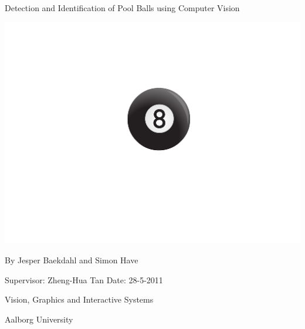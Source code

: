 \begin{titlingpage}
  \thispagestyle{empty}
  \centering
  { \setlength{\baselineskip}{24pt}
    {\Huge Detection and Identification of Pool Balls using Computer Vision
    }\par
    \par\vspace*{4\onelineskip}
    \par


	\includegraphics[width=.5\textwidth]{images/8ball}

    \par\vspace*{2\onelineskip}
	\par\par
    \par
    
    \large By Jesper Baekdahl and Simon Have
  }
  \vfill
  \vspace*{2\onelineskip}
  Supervisor: Zheng-Hua Tan
  Date: 28-5-2011
  \par\vspace*{2\onelineskip}
  \small
  Vision, Graphics and Interactive Systems\par
  Aalborg University
  \enlargethispage{2\onelineskip}
\end{titlingpage}
